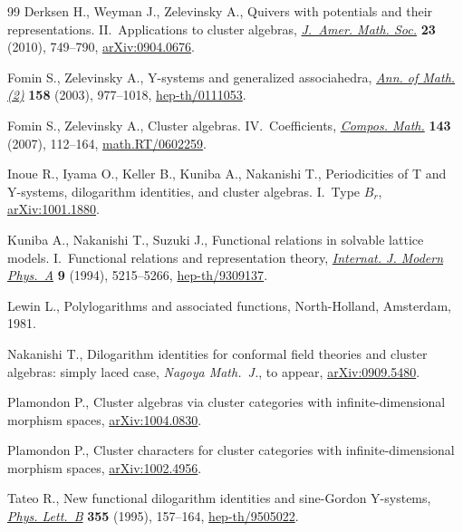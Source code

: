 \documentclass[11pt]{article}
\numberwithin{equation}{section}
\theoremstyle{definition}
\begin{document}
\begin{thebibliography}{99}
Derksen H., Weyman J., Zelevinsky A.,
Quivers with potentials and their representations. II.~Applications to cluster algebras,
\href{http://dx.doi.org/10.1090/S0894-0347-10-00662-4}{{\em J.~Amer. Math. Soc.}} {\bf 23} (2010), 749--790,
\href{http://arxiv.org/abs/0904.0676}{arXiv:0904.0676}.

Fomin S., Zelevinsky A.,
Y-systems and generalized associahedra,
\href{http://dx.doi.org/10.4007/annals.2003.158.977}{{\em Ann. of Math. (2)}} {\bf 158} (2003), 977--1018,
\href{http://arxiv.org/abs/hep-th/0111053}{hep-th/0111053}.

Fomin S., Zelevinsky A.,
Cluster algebras. IV.~Coef\/f\/icients,
\href{http://dx.doi.org/10.1112/S0010437X06002521}{{\em Compos. Math.}} {\bf 143} (2007), 112--164,
\href{http://arxiv.org/abs/math.RT/0602259}{math.RT/0602259}.

Inoue R., Iyama O., Keller B., Kuniba A., Nakanishi T.,
Periodicities of T and Y-systems, dilogarithm identities, and cluster algebras. I.~Type $B_r$,
\href{http://arxiv.org/abs/1001.1880}{arXiv:1001.1880}.

Kuniba A., Nakanishi T., Suzuki J.,
Functional relations in solvable lattice models. I.~Functional relations and representation theory,
\href{http://dx.doi.org/10.1142/S0217751X94002119}{{\em Internat. J. Modern Phys.~A}} {\bf 9} (1994), 5215--5266,
\href{http://arxiv.org/abs/hep-th/9309137}{hep-th/9309137}.

Lewin L.,
Polylogarithms and associated functions,
North-Holland, Amsterdam, 1981.

Nakanishi T.,
Dilogarithm identities for conformal f\/ield theories and cluster  algebras: simply laced case,
{\it Nagoya Math.~J.}, to appear,
\href{http://arxiv.org/abs/0909.5480}{arXiv:0909.5480}.

Plamondon P.,
Cluster algebras via cluster categories with inf\/inite-dimensional morphism spaces,
\href{http://arxiv.org/abs/1004.0830}{arXiv:1004.0830}.

Plamondon P.,
Cluster characters for cluster categories with inf\/inite-dimensional morphism spaces,
\href{http://arxiv.org/abs/1002.4956}{arXiv:1002.4956}.

Tateo R.,
New functional dilogarithm identities and sine-Gordon Y-systems,
\href{http://dx.doi.org/10.1016/0370-2693(95)00751-6}{{\em Phys. Lett.~B}} {\bf 355} (1995), 157--164,
\href{http://arxiv.org/abs/hep-th/9505022}{hep-th/9505022}.

\end{thebibliography}
\end{document}
